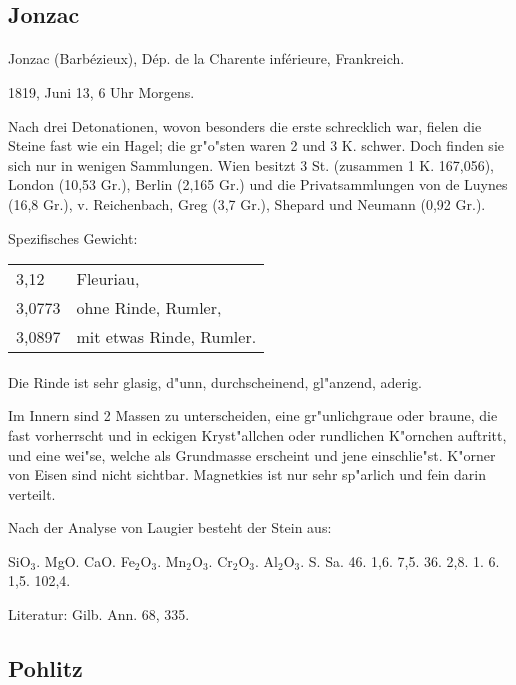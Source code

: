 \documentclass[a4paper, 11pt, oneside]{article}
\begin{document}
\subsection{Jonzac}
\normalsize
\paragraph{}
Jonzac (Barbézieux), Dép. de la Charente inférieure, Frankreich.

1819, Juni 13, 6 Uhr Morgens.

Nach drei Detonationen, wovon besonders die erste schrecklich war, fielen die Steine fast wie ein Hagel; die gr"o"sten waren 2 und 3 K. schwer. Doch finden sie sich nur in wenigen Sammlungen. Wien besitzt 3 St. (zusammen 1 K. 167,056), London (10,53 Gr.), Berlin (2,165 Gr.) und die Privatsammlungen von de Luynes (16,8 Gr.), v. Reichenbach, Greg (3,7 Gr.), Shepard und Neumann (0,92 Gr.).

Spezifisches Gewicht:
\begin{table}[!ht]
    \centering
    \begin{tabular}{l l}
        3,12 & Fleuriau,\\
        3,0773 & ohne Rinde, Rumler,\\
        3,0897 & mit etwas Rinde, Rumler.
    \end{tabular}
\end{table}
\paragraph{}
Die Rinde ist sehr glasig, d"unn, durchscheinend, gl"anzend, aderig.

Im Innern sind 2 Massen zu unterscheiden, eine gr"unlichgraue oder braune, die fast vorherrscht und in eckigen Kryst"allchen oder rundlichen K"ornchen auftritt, und eine wei"se, welche als Grundmasse erscheint und jene einschlie"st. K"orner von Eisen sind nicht sichtbar. Magnetkies ist nur sehr sp"arlich und fein darin verteilt.

Nach der Analyse von Laugier besteht der Stein aus:

SiO$_{3}$. MgO. CaO. Fe$_{2}$O$_{3}$. Mn$_{2}$O$_{3}$. Cr$_{2}$O$_{3}$. Al$_{2}$O$_{3}$. S. Sa.  
46. 1,6. 7,5. 36. 2,8. 1. 6. 1,5. 102,4.

Literatur: Gilb. Ann. 68, 335.

\subsection{Pohlitz}
\normalsize
\end{document}
